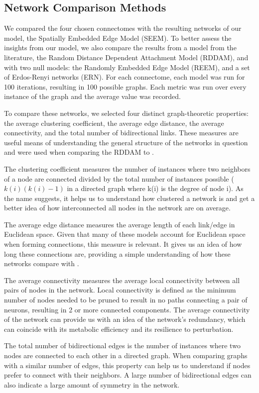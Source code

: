 \subsection{Network Comparison Methods}
We compared the four chosen \ce connectomes with the resulting networks of our model, the Spatially Embedded Edge Model (SEEM). 
To better assess the insights from our model, we also compare the results from a model from the literature, the Random Distance Dependent Attachment Model (RDDAM), and with two null models: the Randomly Embedded Edge Model (REEM), and a set of Erdos-Renyi networks (ERN).
For each connectome, each model was run for 100 iterations, resulting in 100 possible graphs. 
Each metric was run over every instance of the graph and the average value was recorded. 

To compare these networks, we selected four distinct graph-theoretic properties: the average clustering coefficient, the average edge distance, the average connectivity, and the total number of bidirectional links. 
These measures are useful means of understanding the general structure of the networks in question and were used when comparing the RDDAM to \ce \citep{Itzhack}.

The clustering coefficient measures the number of instances where two neighbors of a node are connected divided by the total number of instances possible ($k(i)(k(i)-1)$ in a directed graph where k(i) is the degree of node i). 
As the name suggests, it helps us to understand how clustered a network is and get a better idea of how interconnected all nodes in the network are on average. 

The average edge distance measures the average length of each link/edge in Euclidean space. 
Given that many of these models account for Euclidean space when forming connections, this measure is relevant. 
It gives us an idea of how long these connections are, providing a simple understanding of how these networks compare with \ce. 

The average connectivity measures the average local connectivity between all pairs of nodes in the network.
Local connectivity is defined as the minimum number of nodes needed to be pruned to result in no paths connecting a pair of neurons, resulting in 2 or more connected components.
The average connectivity of the network can provide us with an idea of the network's redundancy, which can coincide with its
metabolic efficiency and its resilience to perturbation.

The total number of bidirectional edges is the number of instances where two nodes are connected to each other in a directed graph.
When comparing graphs with a similar number of edges, this property can help us to understand if nodes prefer to connect with their neighbors.
A large number of bidirectional edges can also indicate a large amount of symmetry in the network.

